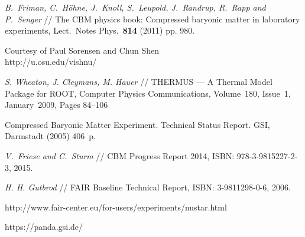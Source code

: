 \begin{thebibliography}{99}


\textit{B.~Friman, C.~H\"{o}hne, J.~Knoll, S.~Leupold, J.~Randrup, R.~Rapp and P.~Senger} //
The CBM physics book: Compressed baryonic matter in laboratory experiments,
Lect.\ Notes Phys.\ {\bf 814} (2011) pp. 980.

Courtesy of Paul Sorensen and Chun Shen \\
http://u.osu.edu/vishnu/

\textit{S. Wheaton, J. Cleymans, M. Hauer} //
THERMUS --- A Thermal Model Package for ROOT,
Computer Physics Communications, Volume~180, Issue~1, January~2009, Pages 84--106


Compressed Baryonic Matter Experiment. Technical Status Report.
GSI, Darmstadt (2005) 406~p.

\textit{V.~Friese and C.~Sturm} // %
CBM Progress Report 2014,
ISBN: 978-3-9815227-2-3, 2015.


\textit{H. H. Gutbrod} // %
FAIR Baseline Technical Report,
ISBN: 3-9811298-0-6, 2006.



http://www.fair-center.eu/for-users/experiments/nustar.html

https://panda.gsi.de/


\end{thebibliography}
